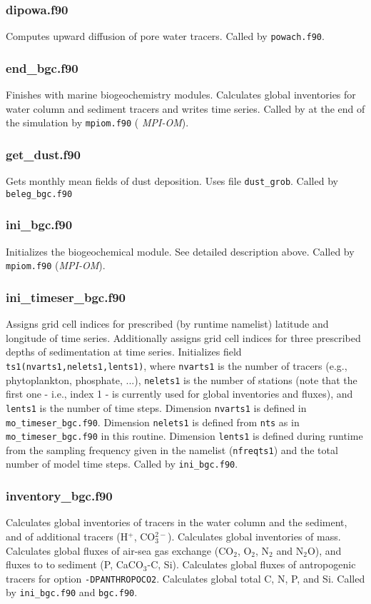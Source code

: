 \documentclass[11pt,a4paper,fleqn,twoside]{article}
\begin{document}
\subsubsection{dipowa.f90} Computes upward diffusion of pore water tracers.
Called by {\tt powach.f90}.

\subsubsection{end\_bgc.f90} Finishes with marine biogeochemistry modules.
Calculates global inventories for water column and sediment tracers and writes
time series. Called by at the end of the simulation by {\tt mpiom.f90} ({\em
MPI-OM}). 

\subsubsection{get\_dust.f90} Gets monthly mean fields of dust deposition. Uses
file {\tt dust\_grob}. Called by {\tt beleg\_bgc.f90}

\subsubsection{ini\_bgc.f90} Initializes the biogeochemical module. See
detailed description above. Called by {\tt mpiom.f90} ({\em MPI-OM}).

\subsubsection{ini\_timeser\_bgc.f90} Assigns grid cell indices for prescribed (by
runtime namelist) latitude and longitude of time series. Additionally assigns 
grid cell indices for three prescribed depths of sedimentation at time series. 
Initializes field {\tt ts1(nvarts1,nelets1,lents1)}, where {\tt nvarts1} is the
number of tracers (e.g., phytoplankton, phosphate, ...), {\tt nelets1} is the
number of stations (note that the first one - i.e., index 1 - is currently used
for global inventories and fluxes), and {\tt lents1} is the number of time
steps. Dimension {\tt nvarts1} is defined in {\tt mo\_timeser\_bgc.f90}.
Dimension {\tt nelets1} is defined from {\tt nts}  as in {\tt
mo\_timeser\_bgc.f90} in this routine. Dimension {\tt lents1} is defined during
runtime from the sampling frequency given in the namelist ({\tt nfreqts1}) and
the total number of model time steps. Called by {\tt ini\_bgc.f90}.

\subsubsection{inventory\_bgc.f90} Calculates global inventories of tracers in
the water column and the sediment, and of additional tracers (H$^+$,
CO$^{2-}_3$).  Calculates global inventories of mass. Calculates global fluxes of
air-sea gas exchange (CO$_2$, O$_2$, N$_2$ and N$_2$O), and fluxes to to
sediment (P, CaCO$_3$-C, Si). Calculates global fluxes of antropogenic tracers
for option {\tt -DPANTHROPOCO2}. Calculates global total C, N, P, and Si. Called
by {\tt ini\_bgc.f90} and {\tt  bgc.f90}.
\end{document}
